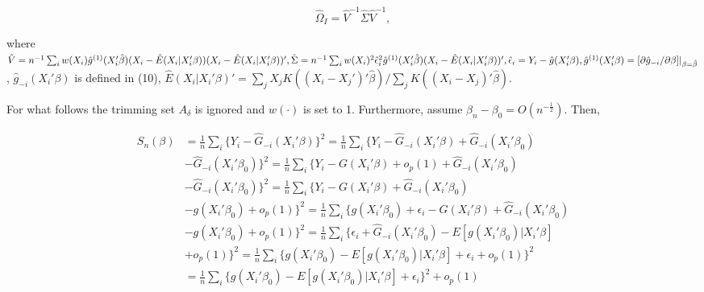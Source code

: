 \documentclass[a4paper]{article}
\newcommand{\norm}[1]{\left\lVert#1\right\rVert}
\begin{document}
\[ \hat{\Omega}_I = \hat{V}^{-1}\hat{\Sigma}\hat{V}^{-1}, \]

where $\hat{V} = n^{-1}\sum_{i} w(X_i)\hat{g}^{(1)}(X_i'\hat{\beta})(X_i - \hat{E}(X_i|X_i'\beta))(X_i - \hat{E}(X_i|X_i'\beta))', \hat{\Sigma} = n^{-1}\sum_{i} w(X_i)^2\hat{\epsilon}_{i}^{2}\hat{g}^{(1)}(X_i'\hat{\beta})(X_i - \hat{E}(X_i|X_i'\beta))', \hat{\epsilon}_i = Y_i - \hat{g}(X_i'\beta), \hat{g}^{(1)}(X_i'\beta) \linebreak
= [\partial \hat{g}_{-i}/\partial \beta]|_{\beta=\hat{\beta}}$, $\hat{g}_{-i}(X_i'\beta)$ is defined in (10), $\hat{E}(X_i|X_i'\beta)' = \sum_{j} X_jK((X_i - X_j')'\hat{\beta})/ \sum_{j}K((X_i - X_j)'\hat{\beta}).$

For what follows the trimming set $A_\delta$ is ignored and $w(\cdot)$ is set to 1. Furthermore, assume $\beta_n - \beta_0 = O(n^{-\frac{1}{2}})$. Then, 



\begin{align*}
S_{n}(\beta) & = \frac{1}{n}\sum_i \{ Y_i - \hat{G}_{-i}(X_i'\beta)\}^2 = \frac{1}{n}\sum_i\{Y_i - \hat{G}_{-i}(X_i'\beta) +  \hat{G}_{-i}(X_i'\beta_0) \\
			 & - \hat{G}_{-i}(X_i'\beta_0) \}^2 = \frac{1}{n} \sum_i \{Y_i - G(X_i'\beta) + o_p(1) + \hat{G}_{-i}(X_i'\beta_0) \\
			 & - \hat{G}_{-i}(X_i'\beta_0) \}^2 = \frac{1}{n}\sum_i \{ Y_i - G(X_i'\beta) + \hat{G}_{-i}(X_i'\beta_0) \\
			 & - g(X_i'\beta_0) + o_p(1) \}^2 = \frac{1}{n} \sum_i \{ g(X_i'\beta_0) + \epsilon_i - G(X_i'\beta) + \hat{G}_{-i}(X_i'\beta_0) \\
			 & - g(X_i'\beta_0) + o_p(1) \}^2 = \frac{1}{n} \sum_i \{ \epsilon_i + \hat{G}_{-i}(X_i'\beta_0) - E[g(X_i'\beta_0)|X_i'\beta] \\
			 & + o_p(1) \}^2 = \frac{1}{n}\sum_i \{ g(X_i'\beta_0) - E[g(X_i'\beta_0)|X_i'\beta] +  \epsilon_i + o_p(1)\}^2 \\
			 & = \frac{1}{n}\sum_i \{ g(X_i'\beta_0) - E[g(X_i'\beta_0)|X_i'\beta] +  \epsilon_i\}^2 + o_p(1)
\end{align*}
\end{document}
